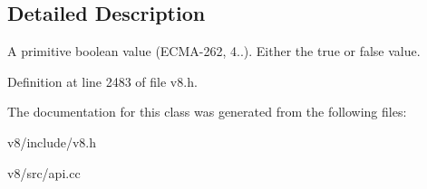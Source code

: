 \subsection{Detailed Description}
A primitive boolean value (E\+C\+M\+A-\/262, 4..). Either the true or false value. 

Definition at line 2483 of file v8.\+h.



The documentation for this class was generated from the following files\+:\begin{DoxyCompactItemize}
\item 
v8/include/v8.\+h\item 
v8/src/api.\+cc\end{DoxyCompactItemize}
